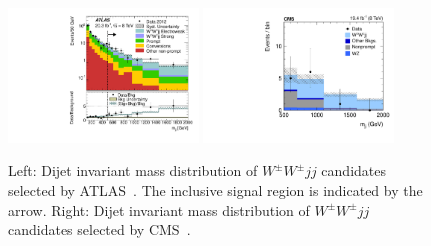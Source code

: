 \begin{figure}[p]
    \centering
    \includegraphics[width=0.45\textwidth]{figures/ss-exclboson-ww-ss-atlas8tev.pdf}
    \includegraphics[width=0.45\textwidth]{figures/ss-exclboson-ww-ss-cms8tev.pdf}
    \caption{
    Left: Dijet invariant mass distribution of $W^{\pm} W^{\pm} jj$ candidates selected by ATLAS~\cite{Aad:2014zda}.  The inclusive signal region is indicated by the arrow.
    Right: Dijet invariant mass distribution of $W^{\pm} W^{\pm} jj$ candidates selected by CMS~\cite{Khachatryan:2014sta}.  }
    \label{fig:ss-exclboson-ww-ss}
\end{figure}
